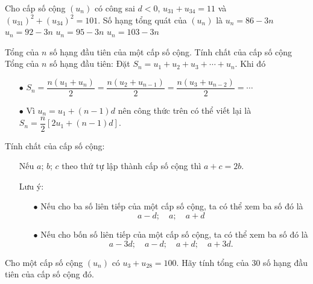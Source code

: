 \begin{ex}%
	Cho cấp số cộng $(u_n)$ có công sai $d<0$, $u_{31}+u_{34}=11$ và $(u_{31})^2 + (u_{34})^2=101$. Số hạng tổng quát của $(u_n)$ là
	\choice
	{$u_{n}=86-3n$}
	{$u_{n}=92-3n$}
	{$u_{n}=95-3n$}
	{\True $u_{n}=103-3n$}
\end{ex}
\begin{dang}{Tổng của $n$ số hạng đầu tiên của một cấp số cộng. Tính chất của cấp số cộng}
	Tổng của $n$ số hạng đầu tiên:	Đặt ${{S}_{n}}={{u}_{1}}+{{u}_{2}}+{{u}_{3}}+\cdots+{{u}_{n}}.$ Khi đó
	\begin{itemize}
		\item [$\bullet$] ${{S}_{n}}=\dfrac{n\left( {{u}_{1}}+{{u}_{n}} \right)}{2}=\dfrac{n\left( {{u}_{2}}+{{u}_{n-1}} \right)}{2}=\dfrac{n\left( {{u}_{3}}+{{u}_{n-2}} \right)}{2}=\cdots$
		\item [$\bullet$] Vì ${{u}_{n}}={{u}_{1}}+\left( n-1 \right)d$ nên công thức trên có thể viết lại là ${{S}_{n}}=\dfrac{n}{2}\left[2u_1 + \left(n-1\right)d \right]  .$
	\end{itemize}
	Tính chất của cấp số cộng:
	\begin{itemize}
		\item [\ding{172}] Nếu $a$; $b$; $c$ theo thứ tự lập thành cấp số cộng thì $a+c=2b$.
		\item [\ding{173}] Lưu ý:
		\begin{itemize}
			\item [$\bullet$] Nếu cho ba số liên tiếp của một cấp số cộng, ta có thể xem ba số đó là $$a-d;\quad a; \quad a+d$$
			\item [$\bullet$] Nếu cho bốn số liên tiếp của một cấp số cộng, ta có thể xem ba số đó là $$a-3d;\quad a-d; \quad a+d; \quad a+3d.$$
		\end{itemize}
	\end{itemize}
\end{dang}
\viduminhhoa
\begin{vd}
	Cho một cấp số cộng $(u_n)$ có $u_3 + u_{28} = 100$. Hãy tính tổng của $30$ số hạng đầu tiên của cấp số cộng đó.
\end{vd}

